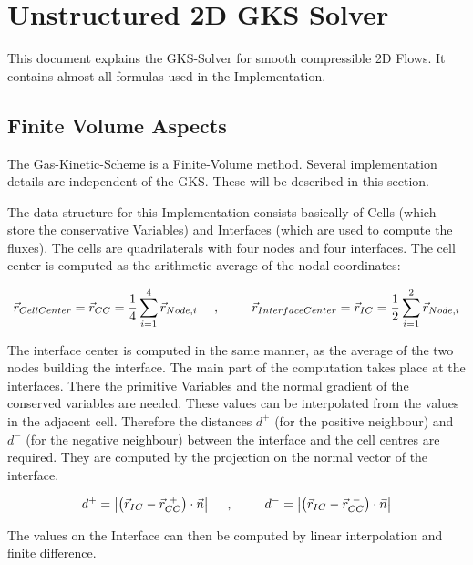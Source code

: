 \documentclass[
	pdftex,             %
	12pt,				%
	a4paper,		   	%
	english,				%
	oneside,			%
]{article}
\newcommand{\vv}[1]{\vec{#1}}
\begin{document}
\section{Unstructured 2D GKS Solver}

This document explains the GKS-Solver for smooth compressible 2D Flows. It contains almost all formulas used in the Implementation.

\subsection{Finite Volume Aspects}

The Gas-Kinetic-Scheme is a Finite-Volume method. Several implementation details are independent of the GKS. These will be described in this section. 

The data structure for this Implementation consists basically of Cells (which store the conservative Variables) and Interfaces (which are used to compute the fluxes). The cells are quadrilaterals with four nodes and four interfaces. The cell center is computed as the arithmetic average of the nodal coordinates:

\begin{equation}
\vv{r}_{CellCenter} = \vv{r}_{CC} = \frac{1}{4} \sum \limits_{i=1}^4 \vv{r}_{Node,i}
\textnormal{~~~~,~~~~~~~~}
\vv{r}_{InterfaceCenter} = \vv{r}_{IC} = \frac{1}{2} \sum \limits_{i=1}^2 \vv{r}_{Node,i}
\end{equation}

The interface center is computed in the same manner, as the average of the two nodes building the interface. The main part of the computation takes place at the interfaces. There the primitive Variables and the normal gradient of the conserved variables are needed. These values can be interpolated from the values in the adjacent cell. Therefore the distances $d^+$ (for the positive neighbour) and $d^-$ (for the negative neighbour) between the interface and the cell centres are required. They are computed by the projection on the normal vector of the interface.

\begin{equation}
d^+ = \left| \left( \vv{r}_{IC} - \vv{r}_{CC}^{~+} \right) \cdot \vv{n} \right|
\textnormal{~~~~,~~~~~~~~}
d^- = \left| \left( \vv{r}_{IC} - \vv{r}_{CC}^{~-} \right) \cdot \vv{n} \right|
\end{equation}

The values on the Interface can then be computed by linear interpolation and finite difference.
\end{document}
